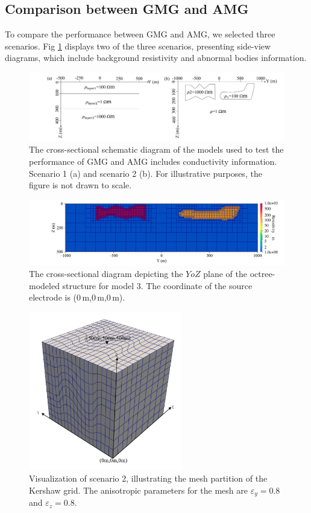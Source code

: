 \documentclass[extra, referee]{gji}
\begin{document}
\subsection{Comparison between GMG and AMG}
To compare the performance between GMG and AMG, we selected three scenarios. Fig
\ref{fig:two_scenarios} displays two of the three scenarios, presenting side-view
diagrams, which include background resistivity and abnormal bodies information.
\begin{figure}
  \centering
  \includegraphics[width=1\textwidth]{fig/two_scenarios.pdf}
  \caption{The cross-sectional schematic diagram of the models used to test the performance of GMG and AMG includes conductivity information. Scenario 1 (a) and scenario 2 (b). For illustrative purposes, the figure is not drawn to scale.}
  \label{fig:two_scenarios}
\end{figure}
\begin{figure}
  \centering
  \includegraphics[width=1\textwidth]{fig/complex_model.pdf}
  \caption{The cross-sectional diagram depicting the $YoZ$ plane of the octree-modeled structure for model 3. The coordinate of the source electrode is (0\,m,0\,m,0\,m).}
  \label{fig:complex_model}
\end{figure}
\begin{figure}
  \centering
  \includegraphics[width=0.6\textwidth]{fig/unstructured_model.pdf}
  \caption{Visualization of scenario 2, illustrating the mesh partition of the Kershaw grid. The anisotropic parameters for the mesh are $\varepsilon_y=0.8$ and $\varepsilon_z=0.8$.}
  \label{fig:unstructured_model}
\end{figure}
\end{document}
